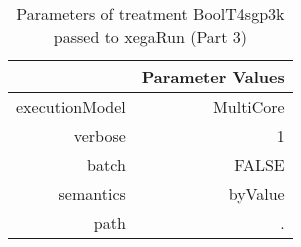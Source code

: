 \begin{table}[ht]
\centering
\begin{tabular}{rr}
  \hline
 & Parameter Values \\ 
  \hline
executionModel & MultiCore \\ 
  verbose & 1 \\ 
  batch & FALSE \\ 
  semantics & byValue \\ 
  path & . \\ 
   \hline
\end{tabular}
\caption{ Parameters of treatment BoolT4sgp3k passed to xegaRun
 (Part 3)} 
\end{table}
